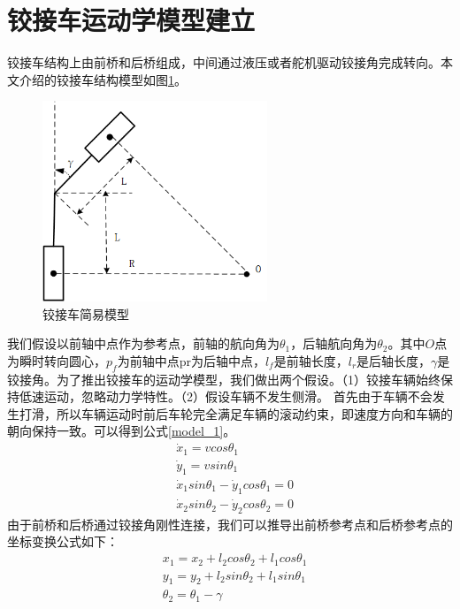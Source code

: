\documentclass[master,academic]{ysuthesis} %
\begin{document}
	\section{铰接车运动学模型建立}
	铰接车结构上由前桥和后桥组成，中间通过液压或者舵机驱动铰接角完成转向。本文介绍的铰接车结构模型如图\ref{fig:铰接车简易模型}。
	\begin{figure}[!ht]
		\centering
		\includegraphics[width=0.6\textwidth]{铰接车简易模型.png}
		\caption{铰接车简易模型}
		\label{fig:铰接车简易模型}
	\end{figure}
	我们假设以前轴中点作为参考点，前轴的航向角为$\theta_1$，后轴航向角为$\theta_2$。其中$O$点为瞬时转向圆心，$p_f$为前轴中点pr为后轴中点，$l_f$是前轴长度，$l_r$是后轴长度，$\gamma$是铰接角。为了推出铰接车的运动学模型，我们做出两个假设。（1）铰接车辆始终保持低速运动，忽略动力学特性。（2）假设车辆不发生侧滑。
	首先由于车辆不会发生打滑，所以车辆运动时前后车轮完全满足车辆的滚动约束，即速度方向和车辆的朝向保持一致。可以得到公式\ref{model_1}。
	\begin{equation}
		\begin{aligned}
			&\dot{x}_1=vcos\theta _1\\
			&\dot{y}_1=vsin\theta _1\\
			&\dot{x}_1sin\theta _1-\dot{y}_1cos\theta _1=0\\
			&\dot{x}_2sin\theta _2-\dot{y}_2cos\theta _2=0
		\end{aligned}
		\label{model_1}
	\end{equation}
	由于前桥和后桥通过铰接角刚性连接，我们可以推导出前桥参考点和后桥参考点的坐标变换公式如下：
	\begin{equation}
		\begin{aligned}
			&x_1=x_2+l_2cos\theta _2+l_1cos\theta _1\\
			&y_1=y_2+l_2sin\theta _2+l_1sin\theta _1\\
			&\theta _2=\theta _1-\gamma 
		\end{aligned}
	\end{equation}
\end{document}
